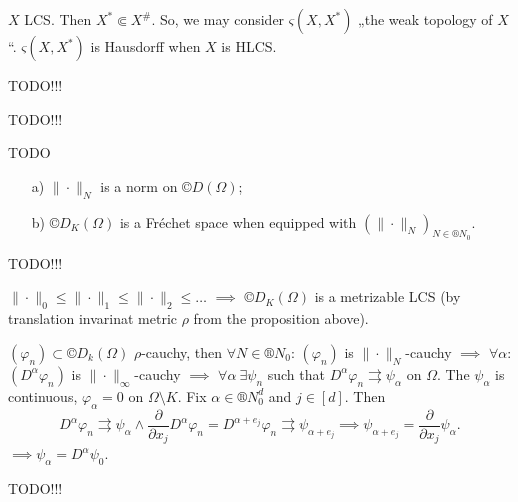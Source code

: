 \documentclass[12pt]{article}					%
\begin{document}
\begin{priklad}
	$X$ LCS. Then $X^* \Subset X^{\#}$. So, we may consider $ς(X, X^*)$ „the weak topology of $X$“. $ς(X, X^*)$ is Hausdorff when $X$ is HLCS.
\end{priklad}


TODO!!!


TODO!!!

\begin{lemma}
	TODO

	\begin{itemize}
		\item[a)] $\|·\|_N$ is a norm on $©D(Ω)$;
		\item[b)] $©D_K(Ω)$ is a Fréchet space when equipped with $(\|·\|_N)_{N \in ®N_0}$.
	\end{itemize}

	\begin{dukazin}[a)]
		TODO!!!
	\end{dukazin}

	\begin{dukazin}[b)]
		$\|·\|_0 ≤ \|·\|_1 ≤ \|·\|_2 ≤ … $ $\implies$ $©D_K(Ω)$ is a metrizable LCS (by translation invarinat metric $ρ$ from the proposition above).

		$(φ_n) \subset ©D_k(Ω)$ $ρ$-cauchy, then $\forall N \in ®N_0$: $(φ_n)$ is $\|·\|_N$-cauchy $\implies$ $\forall α$: $(D^α φ_n)$ is $\|·\|_∞$-cauchy $\implies$ $\forall α\ \exists ψ_n$ such that $D^α φ_n \rightrightarrows ψ_α$ on $Ω$. The $ψ_α$ is continuous, $φ_α = 0$ on $Ω \setminus K$. Fix $α \in ®N_0^d$ and $j \in [d]$. Then
		$$ D^α φ_n \rightrightarrows ψ_α \land \frac{\partial}{\partial x_j} D^α φ_n = D^{α+e_j}φ_n \rightrightarrows ψ_{α + e_j} \implies ψ_{α + e_j} = \frac{\partial}{\partial x_j} ψ_α. $$
		$\implies ψ_α = D^α ψ_0$.

		TODO!!!
	\end{dukazin}
\end{lemma}
\end{document}
